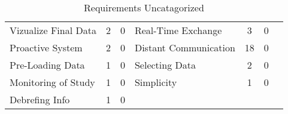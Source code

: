 \begin{table}[htbp]
\begin{tabular}{lcclccc}
        Vizualize Final Data                                       & 2                          & 0                         & Real-Time Exchange                                         & 3                          & 0                         \\
        Proactive System                                           & 2                          & 0                         & Distant Communication                                      & 18                         & 0                         \\
        Pre-Loading Data                                           & 1                          & 0                         & Selecting Data                                              & 2                          & 0                         \\
        Monitoring of Study                                        & 1                          & 0                         & Simplicity                                                  & 1                          & 0                         \\
        Debrefing Info                                             & 1                          & 0                         & & & & \\\hline
        \end{tabular}
        \caption[Requirements Uncatagorized]{Requirements Uncatagorized}\label{tab:requirementsRaw1}
        \end{table}


